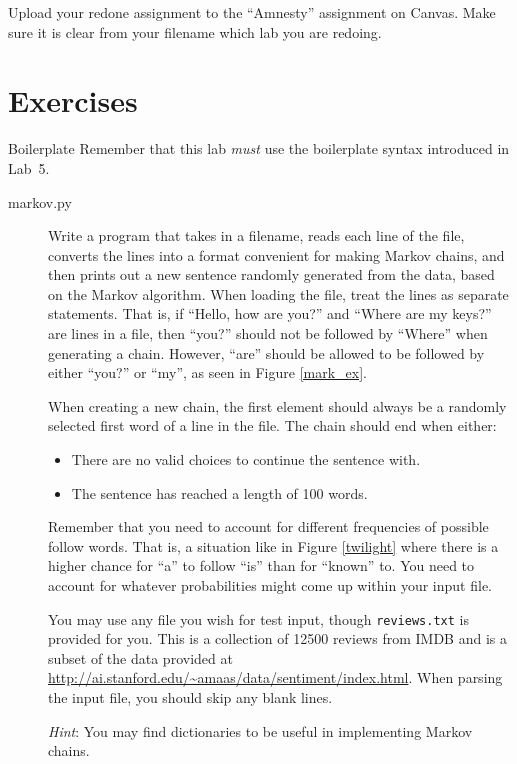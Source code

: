 \documentclass[11pt]{cselabheader}
\begin{document}
Upload your redone assignment to the ``Amnesty'' assignment on Canvas.
Make sure it is clear from your filename which lab you are redoing.

\section{Exercises}
\label{sec:ex}

\begin{warningbox}{Boilerplate}
  Remember that this lab \emph{must} use the
  boilerplate syntax introduced in Lab~5.
\end{warningbox}

\begin{description}
\item[markov.py] Write a program that takes in a filename, reads each line of the file, converts the lines into a format convenient for making Markov chains, and then prints out a new sentence randomly generated from the data, based on the Markov algorithm. When loading the file, treat the lines as separate statements. That is, if ``Hello, how are you?'' and ``Where are my keys?'' are lines in a file, then ``you?'' should not be followed by ``Where'' when generating a chain. However, ``are'' should be allowed to be followed by either ``you?'' or ``my'', as seen in Figure \ref{mark_ex}.

  When creating a new chain, the first element should always be a randomly selected first word of a line in the file. The chain should end when either:
  \begin{itemize}
  \item There are no valid choices to continue the sentence with.
  \item The sentence has reached a length of 100 words.
  \end{itemize}

  Remember that you need to account for different frequencies of possible
  follow words. That is, a situation like in Figure \ref{twilight} where
  there is a higher chance for ``a'' to follow ``is'' than for ``known''
  to. You need to account for whatever probabilities might come up within
  your input file.

  You may use any file you wish for test input, though \lstinline{reviews.txt} is provided for you. This is a collection of 12500 reviews from IMDB and is a subset of the data provided at \url{http://ai.stanford.edu/~amaas/data/sentiment/index.html}. When parsing the input file, you should skip any blank lines.

  \emph{Hint}: You may find dictionaries to be useful in implementing
  Markov chains.

\end{description}
\end{document}

